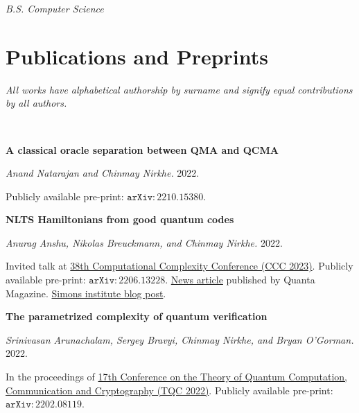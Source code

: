 \documentclass[11pt]{article}
\begin{document}
\textit{B.S. Computer Science}








\section{Publications and Preprints}
\textit{All works have alphabetical authorship by surname and signify equal contributions by all authors.}

\
\begin{enumerate}[{leftmargin=*,start=10,label=[\arabic*]\addtocounter{enumi}{-2}}]

\item \textbf{A classical oracle separation between QMA and QCMA}

\emph{Anand Natarajan and Chinmay Nirkhe.} 2022.

Publicly available pre-print: \href{https://arxiv.org/abs/2210.15380}{$\mathtt{arXiv:2210.15380}$}.

\item \textbf{NLTS Hamiltonians from good quantum codes}

\emph{Anurag Anshu, Nikolas Breuckmann, and Chinmay Nirkhe.} 2022.

Invited talk at \href{https://computationalcomplexity.org/Archive/2023/cfp.php}{38th Computational Complexity Conference (CCC 2023)}. Publicly available pre-print: \href{https://arxiv.org/abs/2206.13228}{$\mathtt{arXiv:2206.13228}$}. \href{https://www.quantamagazine.org/computer-science-proof-lifts-limits-on-quantum-entanglement-20220718/}{News article} published by Quanta Magazine. \href{https://blog.simons.berkeley.edu/2022/08/the-blind-men-and-the-quantum-elephants/}{Simons institute blog post}.

\item \textbf{The parametrized complexity of quantum verification}

\emph{Srinivasan Arunachalam, Sergey Bravyi, Chinmay Nirkhe, and Bryan O'Gorman.} 2022.

In the proceedings of \href{https://tqc2022-conference.iquist.illinois.edu/}{17th Conference on the Theory of Quantum Computation, Communication and Cryptography (TQC 2022)}. Publicly available pre-print: \href{https://arxiv.org/abs/2202.08119}{$\mathtt{arXiv:2202.08119}$}.


\end{enumerate}
\end{document}
